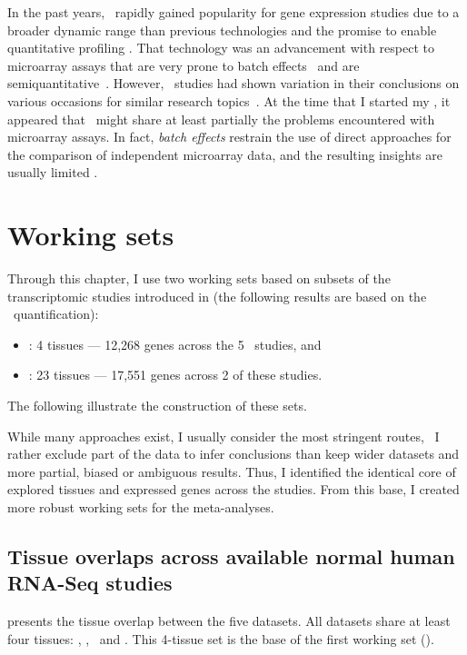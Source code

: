 In the past years,
\Rnaseq\ rapidly gained popularity
for gene expression studies
due to a broader dynamic range than previous technologies
and the promise to enable quantitative profiling .
That technology was an advancement with respect to microarray assays
that are very prone to batch effects~
and are semiquantitative~.
However, \Rnaseq\ studies had shown variation in their conclusions on various
occasions for similar research topics~.
At the time that I started my \phd,
it appeared that
\Rnaseq\ might share at least partially the problems encountered
with microarray assays.
In fact, \emph{batch effects} restrain the use of direct approaches
for the comparison of independent microarray data,
and the resulting insights are usually limited .\mybr\
\vspace{-1mm}

\section{Working sets}
\vspace{-2mm}
Through this chapter, I use two working sets
based on subsets of the transcriptomic studies introduced in 
(the following results are based on the \htseq\ quantification):\mybr\
\begin{itemize}[topsep=0pt,nosep]
    \item \setOne: 4 tissues --- 12,268 genes across the 5 \Rnaseq\ studies, and
    \item \setTwo: 23 tissues --- 17,551 genes across 2 of these studies.
\end{itemize}

The following 
illustrate the construction of these sets.\mybr\

While many approaches exist,
I usually consider the most stringent routes,
\ie\ I rather exclude part of the data to infer conclusions than
keep wider datasets and more partial, biased or ambiguous results.
Thus, I identified the identical core of
explored tissues and expressed genes across the studies.
From this base, I created more robust working sets for the meta-analyses.\mybr\

\subsection{Tissue overlaps across available normal human RNA-Seq studies \quad}%
\label{subsec:transtissueOverlap}
\vspace{-7mm}
 presents the tissue overlap between the five datasets.
All datasets share at least four tissues:
\heart, \kidney, \liver\ and \testis.
This 4-tissue set is the base of the first working set (\setOne).\mybr\


